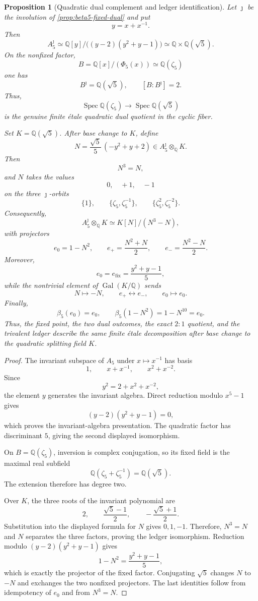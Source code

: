 \documentclass[11pt]{article}
\newtheorem{proposition}[theorem]{Proposition}
\theoremstyle{remark}
\newcommand{\Q}{\mathbb Q}
\newcommand{\Gal}{\operatorname{Gal}}
\newcommand{\Spec}{\operatorname{Spec}}
\begin{document}
\begin{proposition}[Quadratic dual complement and ledger identification]
\label{prop:beta5-ledger}
Let $\jmath$ be the involution of
\cref{prop:beta5-fixed-dual} and put
\[
 y=x+x^{-1}.
\]
Then
\[
 \boxed{
 A_5^{\jmath}
 \simeq
 \Q[y]/\bigl((y-2)(y^2+y-1)\bigr)
 \simeq
 \Q\times\Q(\sqrt5).
 }
\]
On the nonfixed factor,
\[
 B=\Q[x]/(\Phi_5(x))\simeq\Q(\zeta_5)
\]
one has
\[
 B^{\jmath}=\Q(\sqrt5),
 \qquad
 \boxed{[B:B^{\jmath}]=2.}
\]
Thus,
\[
 \Spec\Q(\zeta_5)\longrightarrow\Spec\Q(\sqrt5)
\]
is the genuine finite \'etale quadratic dual quotient in the cyclic fiber.

Set $K=\Q(\sqrt5)$.  After base change to $K$, define
\[
 \boxed{
 N=\frac{\sqrt5}{5}\,(-y^2+y+2)
 \in A_5^{\jmath}\otimes_{\Q}K.
 }
\]
Then
\[
 N^3=N,
\]
and $N$ takes the values
\[
 0,\quad +1,\quad -1
\]
on the three $\jmath$-orbits
\[
 \{1\},\qquad
 \{\zeta_5,\zeta_5^{-1}\},\qquad
 \{\zeta_5^2,\zeta_5^{-2}\}.
\]
Consequently,
\[
 A_5^{\jmath}\otimes_{\Q}K
 \simeq K[N]/(N^3-N),
\]
with projectors
\[
 e_0=1-N^2,
 \qquad
 e_+=\frac{N^2+N}{2},
 \qquad
 e_-=\frac{N^2-N}{2}.
\]
Moreover,
\[
 \boxed{e_0=e_{\mathrm{fix}}=\frac{y^2+y-1}{5},}
\]
while the nontrivial element of $\Gal(K/\Q)$ sends
\[
 N\longmapsto-N,
 \qquad
 e_+\longleftrightarrow e_-,
 \qquad
 e_0\longmapsto e_0.
\]
Finally,
\[
 \boxed{
 \beta_5(e_0)=e_0,
 \qquad
 \beta_5(1-N^2)=1-N^{10}=e_0.
 }
\]
Thus, the fixed point, the two dual outcomes, the exact $2{:}1$ quotient,
and the trivalent ledger describe the same finite \'etale decomposition after
base change to the quadratic splitting field $K$.
\end{proposition}

\begin{proof}
The invariant subspace of $A_5$ under $x\mapsto x^{-1}$ has basis
\[
 1,\qquad x+x^{-1},\qquad x^2+x^{-2}.
\]
Since
\[
 y^2=2+x^2+x^{-2},
\]
the element $y$ generates the invariant algebra.  Direct reduction modulo $x^5-1$ gives
\[
 (y-2)(y^2+y-1)=0,
\]
which proves the invariant-algebra presentation.  The quadratic factor has
discriminant $5$, giving the second displayed isomorphism.

On $B=\Q(\zeta_5)$, inversion is complex conjugation, so its fixed field is
the maximal real subfield
\[
 \Q(\zeta_5+\zeta_5^{-1})=\Q(\sqrt5).
\]
The extension therefore has degree two.

Over $K$, the three roots of the invariant polynomial are
\[
 2,\qquad \frac{\sqrt5-1}{2},\qquad
 -\frac{\sqrt5+1}{2}.
\]
Substitution into the displayed formula for $N$ gives $0,1,-1$.
Therefore, $N^3=N$ and $N$ separates the three factors, proving the ledger
isomorphism.  Reduction modulo
$(y-2)(y^2+y-1)$ gives
\[
 1-N^2=\frac{y^2+y-1}{5},
\]
which is exactly the projector of the fixed factor.  Conjugating
$\sqrt5$ changes $N$ to $-N$ and exchanges the two nonfixed projectors.
The last identities follow from idempotency of $e_0$ and from $N^3=N$.
\end{proof}
\end{document}
